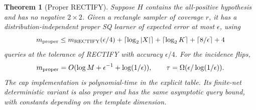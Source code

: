 \documentclass[11pt]{article}
\newtheorem{theorem}{Theorem}
\newcommand{\1}{\mathbf 1}
\begin{document}
\begin{samepage}
\begin{theorem}[Proper RECTIFY]\label{thm:proper}
Suppose $H$ contains the all-positive hypothesis and has no negative $2\times2$. Given a rectangle sampler of coverage $r$, it has a distribution-independent proper SQ learner of expected error at most $\epsilon$, using
\begin{equation}\label{eq:propercomplexity}
 m_{\rm proper}\le m_{\rm RECTIFY}(\epsilon/4)
 +\lceil\log_2|X|\rceil+\lceil\log_2K\rceil
 +\lceil8/\epsilon\rceil+4
\end{equation}
queries at the tolerance of RECTIFY with accuracy $\epsilon/4$. For the incidence flips,
\[
 m_{\rm proper}=O(\log M+\epsilon^{-1}+\log(1/\epsilon)),\qquad
 \tau=\Omega(\epsilon/\log(1/\epsilon)).
\]
The cap implementation is polynomial-time in the explicit table. Its finite-net deterministic variant is also proper and has the same asymptotic query bound, with constants depending on the template dimension.
\end{theorem}
\end{samepage}
\begin{center}\end{center}
\end{document}
